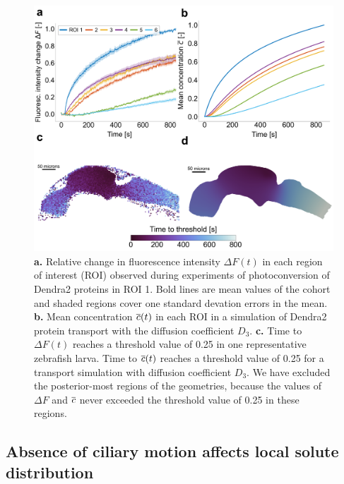 \documentclass{WileyMSP-template}
\begin{document}
\begin{figure}%
    \centering
    \includegraphics[width=\textwidth]{graphics/figure3_compare_experiments_and_simulations.png}
    \caption{
    \textbf{a.} Relative change in fluorescence intensity $\Delta F(t)$ 
    in each region of interest (ROI)
    observed during experiments of photoconversion of Dendra2 proteins in ROI 1. 
    Bold lines are mean values of the cohort and shaded regions cover one standard devation errors
    in the mean.
    \textbf{b.} Mean concentration $\overline{c}(t)$ in each ROI in a
    simulation of Dendra2 protein transport with
    the diffusion coefficient $D_3$.
    \textbf{c.} Time to $\Delta F(t)$ reaches a threshold value of 0.25 in
    one representative zebrafish larva.
    Time to $\overline{c}(t)$ reaches a threshold value of 0.25 for
    a transport simulation with diffusion coefficient $D_3$.
    We have excluded the posterior-most regions of the geometries,
    because the values of $\Delta F$ and $\overline{c}$ never exceeded the threshold
    value of 0.25 in these regions.}
    \label{fig:fig3}
\end{figure}

\subsection{Absence of ciliary motion affects local solute distribution}
\end{document}
